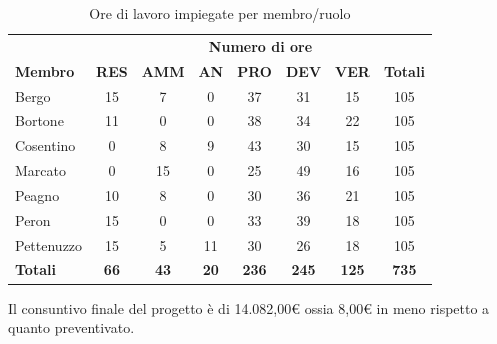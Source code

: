 \begin{table}[H]
			\centering
			
			\begin{tabular}{| l | c c c c c c | c |}
			\rowcolor{LightBlue}
			& \multicolumn{7}{c}{\textbf{\color{white}Numero di ore}}	\\
			
			\rowcolor{LightBlue}
			\textbf{\color{white}Membro}
			& \textbf{\color{white}RES}
			& \textbf{\color{white}AMM}
			& \textbf{\color{white}AN}
			& \textbf{\color{white}PRO}
			& \textbf{\color{white}DEV}
			& \textbf{\color{white}VER}
			& \textbf{\color{white}Totali}\\
			Bergo & 15 & 7 & 0 & 37 & 31 & 15 & 105\\
			Bortone & 11 & 0 & 0 & 38 & 34 & 22 & 105\\
			Cosentino & 0 & 8 & 9 & 43 & 30 & 15 & 105\\
			Marcato  & 0 & 15 & 0 & 25 & 49 & 16 & 105\\
			Peagno & 10 & 8 & 0 & 30 & 36 & 21 & 105\\
			Peron   & 15 & 0 & 0 & 33 & 39 & 18 & 105\\
			Pettenuzzo & 15 & 5 & 11 & 30 & 26 & 18 & 105\\ 
			\hline
			\rowcolor{LightBlue}
			\textbf{\color{white}Totali} & \textbf{\color{white}66} & \textbf{\color{white}43} & \textbf{\color{white}20} & \textbf{\color{white}236} & \textbf{\color{white}245} & \textbf{\color{white}125} & \textbf{\color{white}735} \\ \hline
			
		\end{tabular}
		\caption{Ore di lavoro impiegate per membro/ruolo}
	\end{table}
	
	Il consuntivo finale del progetto è di 14.082,00€ ossia 8,00€ in meno rispetto a quanto preventivato.


